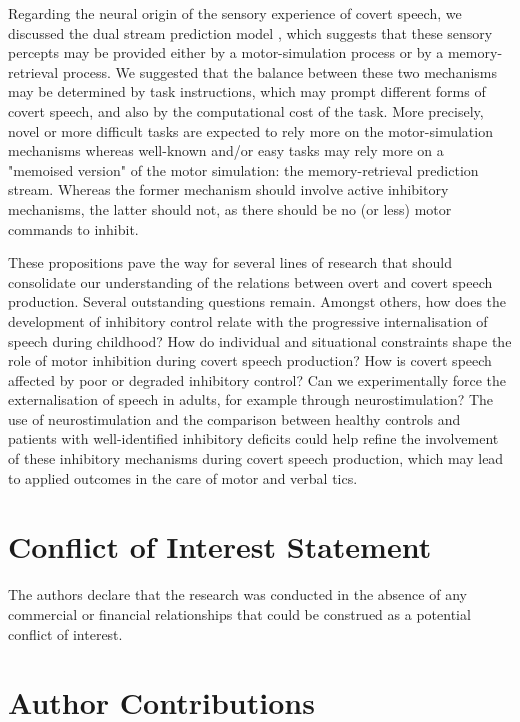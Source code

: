 \documentclass[utf8]{template/frontiersSCNS} %
\begin{document}
Regarding the neural origin of the sensory experience of covert speech, we discussed the dual stream prediction model \citep{tian_mental_2012, tian_effect_2013, tian_mental_2016}, which suggests that these sensory percepts may be provided either by a motor-simulation process or by a memory-retrieval process. We suggested that the balance between these two mechanisms may be determined by task instructions, which may prompt different forms of covert speech, and also by the computational cost of the task. More precisely, novel or more difficult tasks are expected to rely more on the motor-simulation mechanisms whereas well-known and/or easy tasks may rely more on a "memoised version" of the motor simulation: the memory-retrieval prediction stream. Whereas the former mechanism should involve active inhibitory mechanisms, the latter should not, as there should be no (or less) motor commands to inhibit.

These propositions pave the way for several lines of research that should consolidate our understanding of the relations between overt and covert speech production. Several outstanding questions remain. Amongst others, how does the development of inhibitory control relate with the progressive internalisation of speech during childhood? How do individual and situational constraints shape the role of motor inhibition during covert speech production? How is covert speech affected by poor or degraded inhibitory control? Can we experimentally force the externalisation of speech in adults, for example through neurostimulation? The use of neurostimulation and the comparison between healthy controls and patients with well-identified inhibitory deficits could help refine the involvement of these inhibitory mechanisms during covert speech production, which may lead to applied outcomes in the care of motor and verbal tics.

\section*{Conflict of Interest Statement}

The authors declare that the research was conducted in the absence of any commercial or financial relationships that could be construed as a potential conflict of interest.

\section*{Author Contributions}
\end{document}
